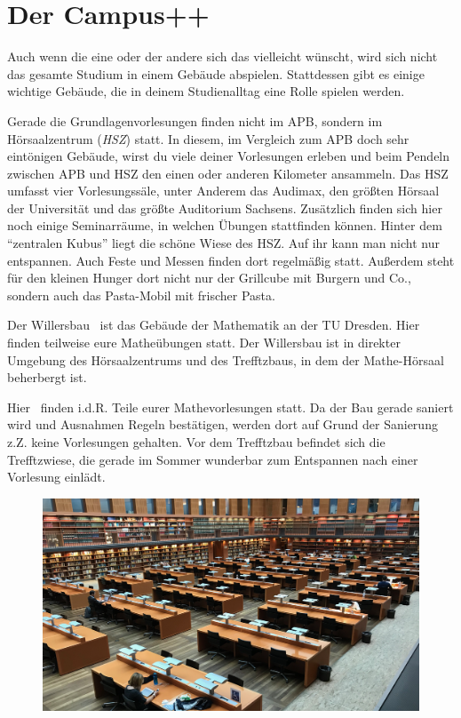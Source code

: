 \chapter*{Der Campus++}

Auch wenn die eine oder der andere sich das vielleicht wünscht, wird sich nicht das gesamte Studium in einem Gebäude abspielen.
Stattdessen gibt es einige wichtige Gebäude, die in deinem Studienalltag eine Rolle spielen werden.

Gerade die Grundlagenvorlesungen finden nicht im APB, sondern im Hörsaalzentrum (\emph{HSZ}) statt.
In diesem, im Vergleich zum APB doch sehr eintönigen Gebäude, wirst du viele deiner Vorlesungen erleben und beim Pendeln zwischen APB und HSZ den einen oder anderen Kilometer ansammeln.
Das HSZ umfasst vier Vorlesungssäle, unter Anderem das Audimax, den größten Hörsaal der Universität und das größte Auditorium Sachsens.
Zusätzlich finden sich hier noch einige Seminarräume, in welchen Übungen stattfinden können. Hinter dem \enquote{zentralen Kubus} liegt die schöne Wiese des HSZ. Auf ihr kann man nicht nur entspannen. Auch Feste und Messen finden dort regelmäßig statt.
Außerdem steht für den kleinen Hunger dort nicht nur
der Grillcube mit Burgern und Co., sondern auch das Pasta-Mobil mit frischer Pasta.

Der Willersbau~ ist das Gebäude der Mathematik an der TU Dresden. Hier finden teilweise eure Matheübungen statt. Der Willersbau ist in direkter Umgebung
des Hörsaalzentrums und des Trefftzbaus, in dem der Mathe-Hörsaal beherbergt ist.

Hier~ finden i.d.R. Teile eurer Mathevorlesungen statt. Da der Bau gerade saniert wird und Ausnahmen Regeln bestätigen, werden dort auf Grund der Sanierung z.Z. keine Vorlesungen gehalten. Vor dem Trefftzbau befindet sich die Trefftzwiese, die gerade im Sommer wunderbar zum Entspannen nach
einer Vorlesung einlädt.

\begin{figure}[b!]
    \centering
    \includegraphics[width=\linewidth]{img/slub-lesesaal}
\end{figure}

